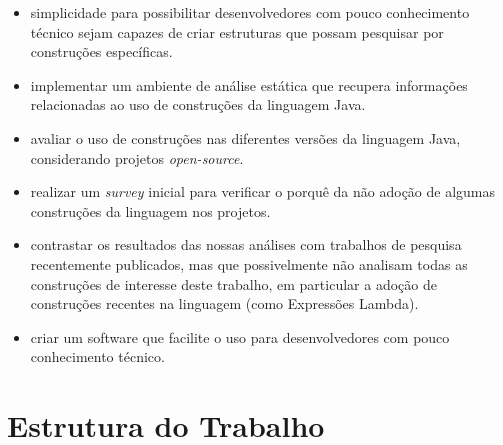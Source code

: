 	\begin{itemize}
		\item simplicidade para possibilitar desenvolvedores com pouco conhecimento técnico sejam capazes de criar estruturas que possam pesquisar por construções específicas.
	
	  \item implementar um ambiente de análise estática que recupera informações relacionadas ao uso  de construções da linguagem Java. 
	  
	  \item avaliar o uso de construções nas diferentes versões da linguagem Java, considerando  projetos \textit{open-source}. 
	  
	  \item realizar um \textit{survey} inicial para verificar o porqu\^{e} da não adoção de algumas construções  da linguagem nos projetos. 
	  
	  \item contrastar os resultados das nossas análises com trabalhos de pesquisa recentemente publicados, mas que possivelmente não analisam todas as construções de interesse deste trabalho, em particular 
	  a adoção de construções recentes na linguagem (como Expressões Lambda). 
	  
	  \item criar um software que facilite o uso para desenvolvedores com pouco conhecimento técnico.
	\end{itemize}


\section{Estrutura do Trabalho}

